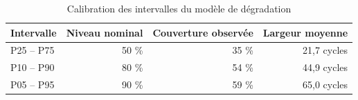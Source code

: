 \begin{table}[htbp]
\centering
\caption{Calibration des intervalles du modèle de dégradation}
\label{tab:rul_calibration}
\begin{tabular}{lrrr}
\toprule
Intervalle & Niveau nominal & Couverture observée & Largeur moyenne \\
\midrule
P25 – P75 & 50 \% & 35 \% & 21,7 cycles \\
P10 – P90 & 80 \% & 54 \% & 44,9 cycles \\
P05 – P95 & 90 \% & 59 \% & 65,0 cycles \\
\bottomrule
\end{tabular}
\end{table}
